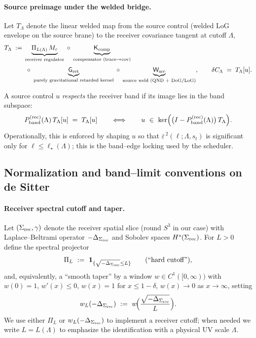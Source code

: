 \documentclass[10pt]{article}
\theoremstyle{definition}
\theoremstyle{plain}
\begin{document}
\paragraph{Source preimage under the welded bridge.}\label{par:uom-main-233}
Let $T_\Lambda$ denote the linear welded map from the source control (welded LoG envelope on the source brane) to the
receiver covariance tangent at cutoff $\Lambda$,
\begin{align}
T_\Lambda
\;:=\;
&\underbrace{\Pi_{L(\Lambda)}\,M_\varepsilon}_{\text{receiver regulator}}
\;\circ\;
\underbrace{\mathsf K_{\rm comp}}_{\text{compensator (trace$\to$cov)}}\nonumber\\[2pt]
&\;\circ\;
\underbrace{\mathsf G_{\rm ret}}_{\text{purely gravitational retarded kernel}}
\;\circ\;
\underbrace{\mathsf W_{\rm src}}_{\text{source weld (QND + DoG/LoG)}},
\qquad
\delta C_\Lambda\;=\;T_\Lambda[u].\label{eq:TLambda-composition}
\end{align}

A source control $u$ \emph{respects} the receiver band if its image lies in the band subspace:
\[
P^{\rm(rec)}_{\rm band}(\Lambda)\,T_\Lambda[u]\;=\;T_\Lambda[u]\qquad\Longleftrightarrow\qquad
u\ \in\ \ker\!\Big(\big(I-P^{\rm(rec)}_{\rm band}(\Lambda)\big)\,T_\Lambda\Big).
\]
Operationally, this is enforced by shaping $u$ so that $\overline{\varepsilon}^{\,2}(\ell;\Lambda,s_t)$ is significant only for $\ell\le \ell_\star(\Lambda)$; this is the band--edge locking used by the scheduler.


\subsection{Normalization and band–limit conventions on de Sitter}\label{subsec:uom-main-012}

\paragraph{Receiver spectral cutoff and taper.}\label{par:uom-main-234}
Let $(\Sigma_{\rm rec},\gamma)$ denote the receiver spatial slice (round $S^3$ in our case) with
Laplace–Beltrami operator $-\Delta_{\Sigma_{\rm rec}}$ and Sobolev spaces $H^s(\Sigma_{\rm rec})$.
For $L>0$ define the spectral projector
\[
\Pi_{L}\ :=\ \mathbf 1_{\{\sqrt{-\Delta_{\Sigma_{\rm rec}}}\le L\}}\qquad
(\text{“hard cutoff”}),
\]
and, equivalently, a “smooth taper” by a window $w\in C^1([0,\infty))$ with
$w(0)=1$, $w'(x)\le 0$, $w(x)=1$ for $x\le 1-\delta$, $w(x)\to 0$ as $x\to\infty$, setting
\[
w_L(-\Delta_{\Sigma_{\rm rec}})\ :=\ w\!\Big(\frac{\sqrt{-\Delta_{\Sigma_{\rm rec}}}}{L}\Big).
\]
We use either $\Pi_L$ or $w_L(-\Delta_{\Sigma_{\rm rec}})$ to implement a receiver cutoff; when needed we
write $L=L(\Lambda)$ to emphasize the identification with a physical UV scale $\Lambda$.
\end{document}
